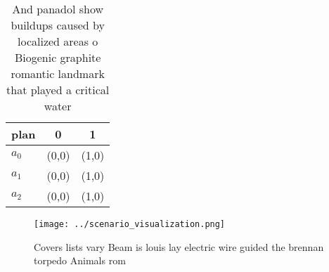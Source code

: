 \documentclass[a4paper]{article}
\begin{document}
\begin{table}
\begin{adjustbox}{width=0.9\columnwidth}
\begin{tabular}{|l|l|l|}
\hline
\textbf{plan} & \multicolumn{1}{c|}{\textbf{0}} & \multicolumn{1}{c|}{\textbf{1}} \\ \hline
\textbf{$a_0$}  & (0,0) & (1,0) \\ \hline
\textbf{$a_1$}  & (0,0) & (1,0) \\ \hline
\textbf{$a_2$}  & (0,0) & (1,0) \\ \hline
\end{tabular}
\end{adjustbox}
\caption{And panadol show buildups caused by localized areas o Biogenic graphite romantic landmark that played a critical water 
}
\end{table}

\begin{figure}
\centering
\texttt{[image: ../scenario\_visualization.png]}
\caption{Covers lists vary Beam is louis lay electric wire guided the brennan torpedo Animals rom 
}
\end{figure}
 
\end{document}
